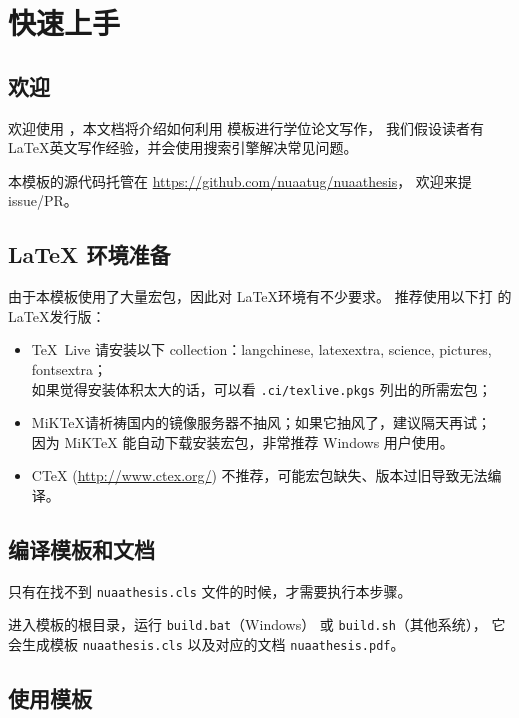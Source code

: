 
\chapter{快速上手}

\section{欢迎}

欢迎使用 \nuaathesis，本文档将介绍如何利用 \nuaathesis 模板进行学位论文写作，
我们假设读者有 \LaTeX 英文写作经验，并会使用搜索引擎解决常见问题。

本模板的源代码托管在 \url{https://github.com/nuaatug/nuaathesis}，
欢迎来提 issue/PR。

\section{\LaTeX{} 环境准备}

由于本模板使用了大量宏包，因此对 \LaTeX 环境有不少要求。
推荐使用以下打  的 \LaTeX 发行版：
\begin{itemize}
\item[\ding{51}]\TeX~Live 请安装以下 collection：langchinese, latexextra, science, pictures, fontsextra；\\
如果觉得安装体积太大的话，可以看 \texttt{.ci/texlive.pkgs} 列出的所需宏包；
\item[\ding{51}]MiK\TeX 请祈祷国内的镜像服务器不抽风；如果它抽风了，建议隔天再试； \\
因为 MiK\TeX{} 能自动下载安装宏包，非常推荐 Windows 用户使用。
\item[\ding{53}]CTeX (\url{http://www.ctex.org/}) 不推荐，可能宏包缺失、版本过旧导致无法编译。
\end{itemize}

\section{编译模板和文档}

只有在找不到 \verb|nuaathesis.cls| 文件的时候，才需要执行本步骤。

进入模板的根目录，运行 \verb|build.bat|（Windows） 或 \verb|build.sh|（其他系统），
它会生成模板 \verb|nuaathesis.cls| 以及对应的文档 \verb|nuaathesis.pdf|。

\section{使用模板}

